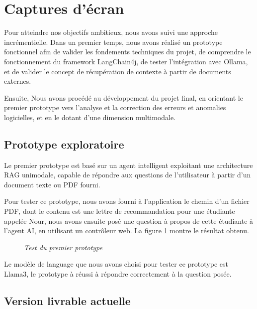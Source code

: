 \documentclass[12pt,a4paper]{report}
\begin{document}
	\section{Captures d'écran}
	
	Pour atteindre nos objectifs ambitieux, nous avons suivi une approche incrémentielle. Dans un premier temps, nous avons réalisé un prototype fonctionnel afin de valider les fondements techniques du projet, de comprendre le fonctionnement du framework LangChain4j, de tester l’intégration avec Ollama, et de valider le concept de récupération de contexte à partir de documents externes.
	
	Ensuite, Nous avons procédé au développement du projet final, en orientant le premier prototype vers l'analyse et la correction des erreurs et anomalies logicielles, et en le dotant d'une dimension multimodale.
	
	\subsection{Prototype exploratoire}
	
	Le premier prototype est basé sur un agent intelligent exploitant une architecture RAG unimodale, capable de répondre aux questions de l’utilisateur à partir d’un document texte ou PDF fourni.
	
	Pour tester ce prototype, nous avons fourni à l'application le chemin d'un fichier PDF, dont le contenu est une lettre de recommandation pour une étudiante appelée Nour, nous avons ensuite posé une question à propos de cette étudiante à l'agent AI, en utilisant un contrôleur web. La figure \ref{fig:test-rag} montre le résultat obtenu.
	
	\begin{figure}[H]
		\centering
		\caption{\textit{Test du premier prototype}}
		\label{fig:test-rag}
	\end{figure}
	
	Le modèle de language que nous avons choisi pour tester ce prototype est Llama3, le prototype à réussi à répondre correctement à la question posée.
	
	\subsection{Version livrable actuelle}
	
\end{document}
